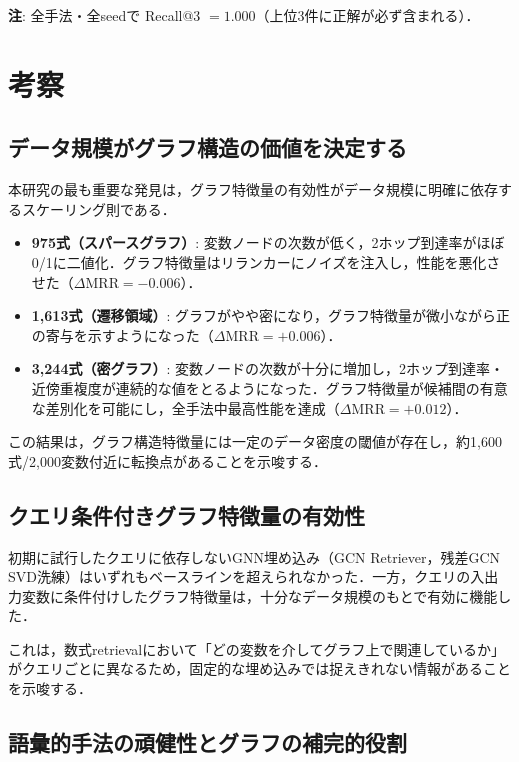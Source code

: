 \documentclass[11pt,a4paper]{ltjsarticle}
\begin{document}
\noindent\textbf{注}: 全手法・全seedで Recall@3 $= 1.000$（上位3件に正解が必ず含まれる）．

\section{考察}

\subsection{データ規模がグラフ構造の価値を決定する}

本研究の最も重要な発見は，グラフ特徴量の有効性がデータ規模に明確に依存するスケーリング則である．

\begin{itemize}
  \item \textbf{975式（スパースグラフ）}: 変数ノードの次数が低く，2ホップ到達率がほぼ0/1に二値化．グラフ特徴量はリランカーにノイズを注入し，性能を悪化させた（$\Delta\mathrm{MRR} = -0.006$）．
  \item \textbf{1,613式（遷移領域）}: グラフがやや密になり，グラフ特徴量が微小ながら正の寄与を示すようになった（$\Delta\mathrm{MRR} = +0.006$）．
  \item \textbf{3,244式（密グラフ）}: 変数ノードの次数が十分に増加し，2ホップ到達率・近傍重複度が連続的な値をとるようになった．グラフ特徴量が候補間の有意な差別化を可能にし，全手法中最高性能を達成（$\Delta\mathrm{MRR} = +0.012$）．
\end{itemize}

この結果は，グラフ構造特徴量には一定のデータ密度の閾値が存在し，約1,600式/2,000変数付近に転換点があることを示唆する．

\subsection{クエリ条件付きグラフ特徴量の有効性}

初期に試行したクエリに依存しないGNN埋め込み（GCN Retriever，残差GCN SVD洗練）はいずれもベースラインを超えられなかった．一方，クエリの入出力変数に条件付けしたグラフ特徴量は，十分なデータ規模のもとで有効に機能した．

これは，数式retrievalにおいて「どの変数を介してグラフ上で関連しているか」がクエリごとに異なるため，固定的な埋め込みでは捉えきれない情報があることを示唆する．

\subsection{語彙的手法の頑健性とグラフの補完的役割}
\end{document}

